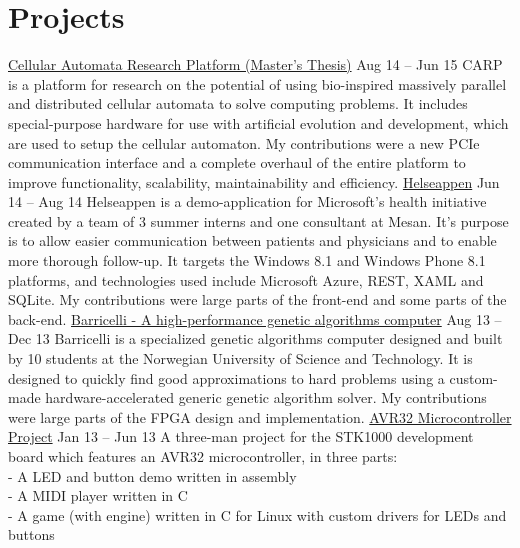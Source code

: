 \documentclass[print,a4paper]{friggeri-cv}
\begin{document}
\clearpage



\section{Projects}

\begin{entrylist}
    \entryy
        {\href{https://github.com/lundal/carp}{Cellular Automata Research Platform (Master's Thesis)}}
        {Aug 14 – Jun 15}
        {CARP is a platform for research on the potential of using bio-inspired massively parallel and distributed cellular automata to solve computing problems.
         It includes special-purpose hardware for use with artificial evolution and development, which are used to setup the cellular automaton.
         My contributions were a new PCIe communication interface and a complete overhaul of the entire platform to improve functionality, scalability, maintainability and efficiency.}
    \entryspace
    \entryy
        {\href{http://fagblogg.mesan.no/sommerjobb-2014-del-2/}{Helseappen}}
        {Jun 14 – Aug 14}
        {Helseappen is a demo-application for Microsoft's health initiative created by a team of 3 summer interns and one consultant at Mesan.
         It's purpose is to allow easier communication between patients and physicians and to enable more thorough follow-up.
         It targets the Windows 8.1 and Windows Phone 8.1 platforms, and technologies used include Microsoft Azure, REST, XAML and SQLite.
         My contributions were large parts of the front-end and some parts of the back-end.}
    \entryspace
    \entryy
        {\href{http://lund.al/barricel.li/}{Barricelli - A high-performance genetic algorithms computer}}
        {Aug 13 – Dec 13}
        {Barricelli is a specialized genetic algorithms computer designed and built by 10 students at the Norwegian University of Science and Technology.
         It is designed to quickly find good approximations to hard problems using a custom-made hardware-accelerated generic genetic algorithm solver.
         My contributions were large parts of the FPGA design and implementation.}
    \entryspace
    \entryy
        {\href{https://github.com/lundal/avr32-project-2013}{AVR32 Microcontroller Project}}
        {Jan 13 – Jun 13}
        {A three-man project for the STK1000 development board which features an AVR32 microcontroller, in three parts:\\
        - A LED and button demo written in assembly\\
        - A MIDI player written in C\\
        - A game (with engine) written in C for Linux with custom drivers for LEDs and buttons}
\end{entrylist}
\end{document}
